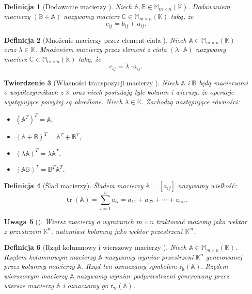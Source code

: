\documentclass[12pt,a4paper]{report}
\newtheorem{df}{Definicja}[chapter]
\newtheorem{tw}[df]{Twierdzenie}
\newtheorem{uwaga}[df]{Uwaga}
\newcommand{\setK}{\mathbb{K}}
\newcommand{\rw}[1]{\operatorname{r_w}\left({#1} \right)}
\newcommand{\rk}[1]{\operatorname{r_k}\left({#1} \right)}
\newcommand{\tr}[1]{\operatorname{tr}\left({#1} \right)}
\begin{document}
\begin{df}[Dodawanie macierzy {\citep[Sec 8.1]{alzega}}]
Niech $\mathbb{A}, \mathbb{B} \in \mathbb{M}_{m \times n} (\setK)$.
Dodawaniem macierzy $(\mathbb{B} + \mathbb{A})$ nazywamy macierz $\mathbb{C} \in \mathbb{M}_{m \times n} (\setK)$ taką, że
$$
c_{ij} = b_{ij} + a_{ij}.
$$
\end{df}

\begin{df}[Mnożenie macierzy przez element ciała {\citep[Sec 8.1]{alzega}}]
Niech $\mathbb{A} \in \mathbb{M}_{m \times n} (\setK)$ oraz $\lambda \in \setK$.
Mnożeniem macierzy przez element z ciała $(\lambda \cdot \mathbb{A})$ nazywamy macierz $\mathbb{C} \in \mathbb{M}_{m \times n} (\setK)$ taką, że
$$
c_{ij} = \lambda \cdot a_{ij}.
$$
\end{df}

\begin{tw}[Własności transpozycji macierzy {\citep[Sec 5.1 Tw. 5.1]{ealIII}}]
Niech $\mathbb{A}$ i $\mathbb{B}$ będą macierzami o współczynnikach z $\setK$ oraz niech posiadają tyle kolumn i wierszy, że operacje występujące powyżej są określone. Niech $\lambda \in \setK$.
Zachodzą następujące równości:
\begin{itemize}
\item $(\mathbb{A}^T)^T = \mathbb{A}$,
\item $(\mathbb{A} + \mathbb{B})^T = \mathbb{A}^T + \mathbb{B}^T$,
\item $(\lambda \mathbb{A})^T = \lambda \mathbb{A}^T$,
\item $(\mathbb{A}\mathbb{B})^T = \mathbb{B}^T \mathbb{A}^T$.
\end{itemize}
\end{tw}

\begin{df}[Ślad macierzy]
Śladem macierzy  $\mathbb{A} = [a_{ij}]$ nazywamy wielkość:
$$
\tr{\mathbb{A}} = \sum_{i=1}^n a_{ii} = a_{11} + a_{22} + \cdots + a_{nn}.
$$
\end{df}

\begin{uwaga}[{\citep[Sec 8.1]{alzega}}]
Wiersz macierzy o wymiarach $m \times n$ traktować możemy jako wektor z przestrzeni $\setK^n$, natomiast kolumną jako wektor przestrzeni $\setK^m$.
\end{uwaga}

\begin{df}[Rząd kolumnowy i wierszowy macierzy {\citep[Sec 8.1]{alzega}}]
Niech $\mathbb{A} \in \mathbb{M}_{m\times n}(\setK)$. Rzędem kolumnowym macierzy $\mathbb{A}$ nazywamy wymiar przestrzeni $\setK^n$ generowanej przez kolumny macierzy $\mathbb{A}$. Rząd ten oznaczamy symbolem $\rk{\mathbb{A}}$. Rzędem wierszowym macierzy $\mathbb{A}$ nazywamy wymiar podprzestrzeni generowany przez wiersze macierzy $\mathbb{A}$ i oznaczamy go $\rw{\mathbb{A}}$.
\end{df}
\end{document}
